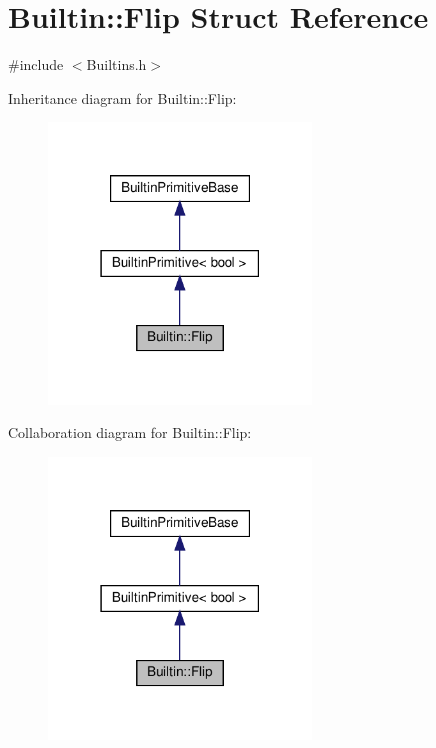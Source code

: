 \hypertarget{struct_builtin_1_1_flip}{}\section{Builtin\+:\+:Flip Struct Reference}
\label{struct_builtin_1_1_flip}


{\ttfamily \#include $<$Builtins.\+h$>$}



Inheritance diagram for Builtin\+:\+:Flip\+:
\nopagebreak
\begin{figure}[H]
\begin{center}
\leavevmode
\includegraphics[width=198pt]{struct_builtin_1_1_flip__inherit__graph}
\end{center}
\end{figure}


Collaboration diagram for Builtin\+:\+:Flip\+:
\nopagebreak
\begin{figure}[H]
\begin{center}
\leavevmode
\includegraphics[width=198pt]{struct_builtin_1_1_flip__coll__graph}
\end{center}
\end{figure}
